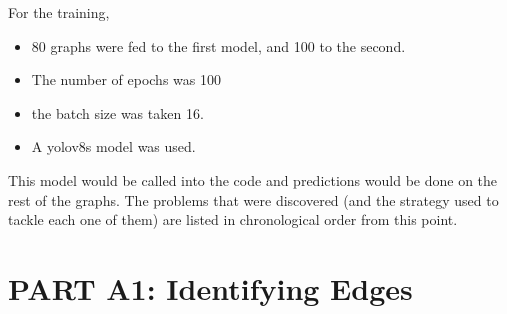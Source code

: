 \documentclass{article}
\begin{document}
For the training, 
\begin{itemize}
    \item 80 graphs were fed to the first model, and 100 to the second.
    \item The number of epochs was 100
    \item the batch size was taken 16.
    \item A yolov8s model was used.
\end{itemize}

This model would be called into the code and predictions would be done on the rest of the graphs. The problems that were discovered (and the strategy used to tackle each one of them) are listed in chronological order from this point.

\section{PART A1: Identifying Edges}
\end{document}
